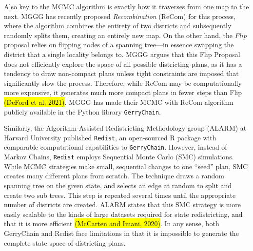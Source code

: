 \documentclass{article}
\begin{document}
\par
Also key to the MCMC algorithm is exactly how it traverses from one map to the next. MGGG has recently proposed \emph{Recombination} (ReCom) for this process, where the algorithm combines the entirety of two districts and subsequently randomly splits them, creating an entirely new map. On the other hand, the \emph{Flip} proposal relies on flipping nodes of a spanning tree—in essence swapping the district that a single locality belongs to.
MGGG argues that this Flip Proposal does not efficiently explore the space of all possible districting plans, as it has a tendency to draw non-compact plans unless tight constraints are imposed that significantly slow the process. Therefore, while ReCom may be computationally more expensive, it generates much more compact plans in fewer steps than Flip \hl{(DeFord et al, 2021)}. MGGG has made their MCMC with ReCom algorithm publicly available in the Python library \lstinline{GerryChain}. 
\par
Similarly, the Algorithm-Assisted Redistricting Methodology group (ALARM) at Harvard University published \lstinline{Redist}, an open-sourced R package with comparable computational capabilities to \lstinline{GerryChain}. However, instead of Markov Chains, \lstinline{Redist} employs Sequential Monte Carlo (SMC) simulations. While MCMC strategies make small, sequential changes to one “seed” plan, SMC creates many different plans from scratch. The technique draws a random spanning tree on the given state, and selects an edge at random to split and create two sub trees. This step is repeated several times until the appropriate number of districts are created. ALARM states that this SMC strategy is more easily scalable to the kinds of large datasets required for state redistricting, and that it is more efficient \hl{(McCarten and Imani, 2020)}. In any sense, both GerryChain and Redist face limitations in that it is impossible to generate the complete state space of districting plans. 
\end{document}

